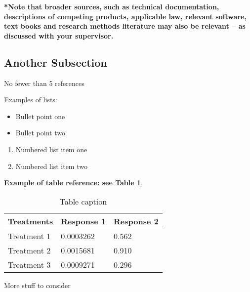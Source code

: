 \textbf{*Note that broader sources, such as technical documentation, descriptions of competing products, applicable law, relevant software, text books and research methods literature may also be relevant -- as discussed with your supervisor.}

\subsection{Another Subsection}

No fewer than 5 references



Examples of lists:
\begin{itemize}
\item Bullet point one
\item Bullet point two
\end{itemize}

\begin{enumerate}
\item Numbered list item one
\item Numbered list item two
\end{enumerate}

\textbf{Example of table reference: see Table \ref{tab:example}}.
\lipsum[4]

\begin{table}[ht] 
\centering
\begin{tabular}{l l l}
\hline
\textbf{Treatments} & \textbf{Response 1} & \textbf{Response 2}\\
\hline
Treatment 1 & 0.0003262 & 0.562 \\
Treatment 2 & 0.0015681 & 0.910 \\
Treatment 3 & 0.0009271 & 0.296 \\
\hline
\end{tabular}
\caption{Table caption}
\label{tab:example}
\end{table}

More stuff to consider \lipsum[1]